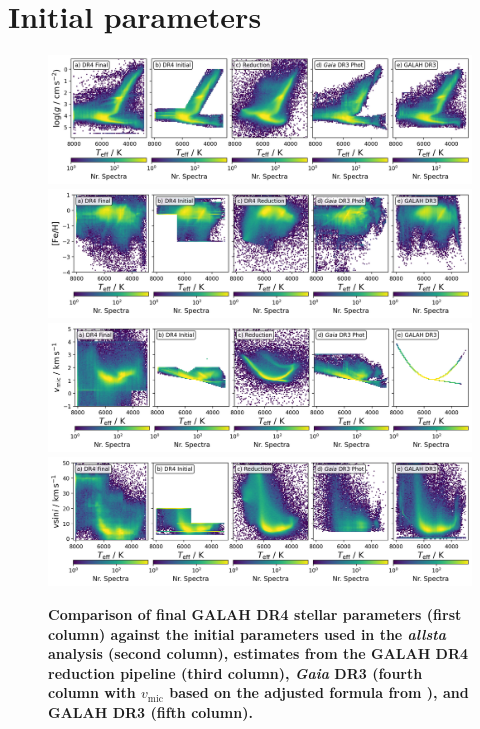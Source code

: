 \documentclass[
  journal=pasa,
  manuscript=research-paper, %
  year=2023,
  volume=37
]{cup-journal}
\newcommand{\vmic}{$v_\mathrm{mic}$\xspace}
\newcommand{\Gaia}{\textit{Gaia}\xspace}
\begin{document}


\appendix

\section{Initial parameters}

\begin{figure}[ht]
 \centering
 \includegraphics[width=\textwidth]{figures/initial_teff_logg.png}
 \includegraphics[width=\textwidth]{figures/initial_teff_fe_h.png}
 \includegraphics[width=\textwidth]{figures/initial_teff_vmic.png}
 \includegraphics[width=\textwidth]{figures/initial_teff_vsini.png} \caption{\textbf{Comparison of final GALAH DR4 stellar parameters (first column) against the initial parameters used in the \textit{allsta} analysis (second column), estimates from the GALAH DR4 reduction pipeline (third column), \Gaia DR3 (fourth column with \vmic based on the adjusted formula from \citet{DutraFerreira2016}), and GALAH DR3 (fifth column).}} \label{fig:initial_parameters}
\end{figure}
\end{document}
